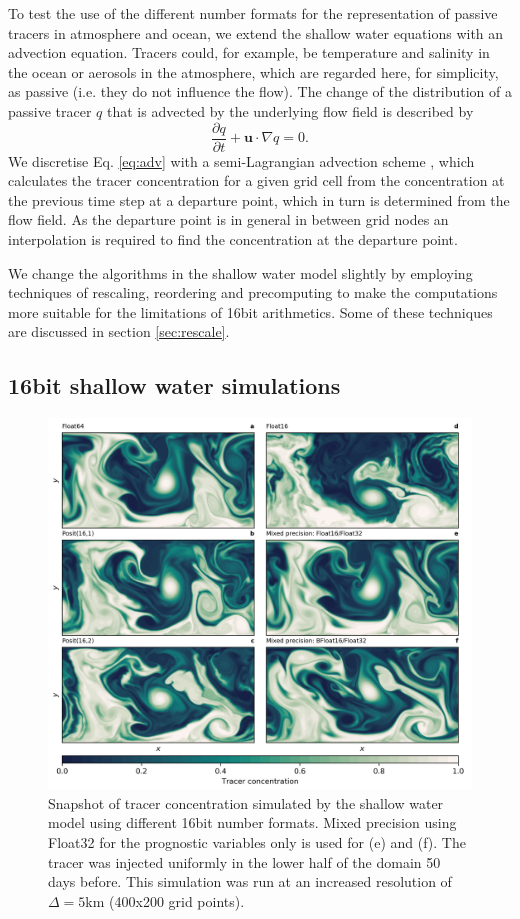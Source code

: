 \documentclass[draft]{agujournal2019}
\begin{document}
To test the use of the different number formats for the representation of passive tracers in atmosphere and ocean, we extend the shallow water equations with an advection equation. Tracers could, for example, be temperature and salinity in the ocean or aerosols in the atmosphere, which are regarded here, for simplicity, as passive (i.e. they do not influence the flow). The change of the distribution of a passive tracer $q$ that is advected by the underlying flow field is described by
\begin{equation}
\frac{\partial q}{\partial t} + \mathbf{u} \cdot \nabla q = 0.
\label{eq:adv}
\end{equation}
We discretise Eq. \ref{eq:adv} with a semi-Lagrangian advection scheme \cite{Smolarkiewicz1992}, which calculates the tracer concentration for a given grid cell from the concentration at the previous time step at a departure point, which in turn is determined from the flow field. As the departure point is in general in between grid nodes an interpolation is required to find the concentration at the departure point.

We change the algorithms in the shallow water model slightly by employing techniques of rescaling, reordering and precomputing to make the computations more suitable for the limitations of 16bit arithmetics. Some of these techniques are discussed in section \ref{sec:rescale}.

\subsection{16bit shallow water simulations}

\begin{figure}
\includegraphics[width=1\textwidth]{../plots/snapshot.png}
\caption{Snapshot of tracer concentration simulated by the shallow water model using different 16bit number formats. Mixed precision using Float32 for the prognostic variables only is used for (e) and (f). The tracer was injected uniformly in the lower half of the domain 50 days before. This simulation was run at an increased resolution of $\Delta = 5$km (400x200 grid points).}
\label{fig:snapshot}
\end{figure}
\end{document}
